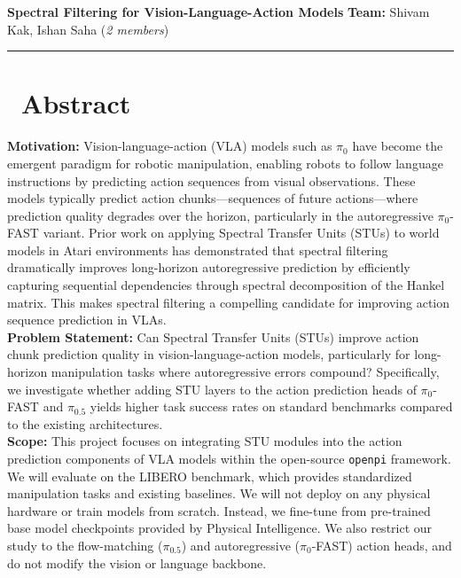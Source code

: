 \documentclass[10pt, letterpaper]{article}
\begin{document}
{\large \textbf{Spectral Filtering for Vision-Language-Action Models}} \hfill \textbf{Team:} Shivam Kak, Ishan Saha (\textit{2 members}) \\
\rule{\textwidth}{0.4pt}

\section*{\faLightbulb\ Abstract}
\textbf{Motivation:} Vision-language-action (VLA) models such as $\pi_0$ have become the emergent paradigm for robotic manipulation, enabling robots to follow language instructions by predicting action sequences from visual observations. These models typically predict action chunks---sequences of future actions---where prediction quality degrades over the horizon, particularly in the autoregressive $\pi_0$-FAST variant. Prior work on applying Spectral Transfer Units (STUs) to world models in Atari environments has demonstrated that spectral filtering dramatically improves long-horizon autoregressive prediction by efficiently capturing sequential dependencies through spectral decomposition of the Hankel matrix. This makes spectral filtering a compelling candidate for improving action sequence prediction in VLAs. \\
\textbf{Problem Statement:} Can Spectral Transfer Units (STUs) improve action chunk prediction quality in vision-language-action models, particularly for long-horizon manipulation tasks where autoregressive errors compound? Specifically, we investigate whether adding STU layers to the action prediction heads of $\pi_0$-FAST and $\pi_{0.5}$ yields higher task success rates on standard benchmarks compared to the existing architectures. \\
\textbf{Scope:} This project focuses on integrating STU modules into the action prediction components of VLA models within the open-source \texttt{openpi} framework. We will evaluate on the LIBERO benchmark, which provides standardized manipulation tasks and existing baselines. We will not deploy on any physical hardware or train models from scratch. Instead, we fine-tune from pre-trained base model checkpoints provided by Physical Intelligence. We also restrict our study to the flow-matching ($\pi_{0.5}$) and autoregressive ($\pi_0$-FAST) action heads, and do not modify the vision or language backbone.

\end{document}
